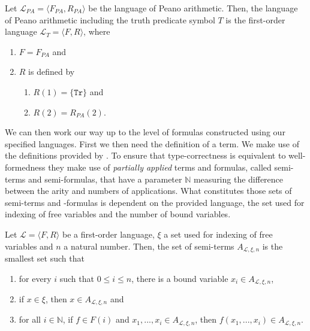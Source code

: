 \begin{definition}\label{def:lt}
    \leanok
    Let $\mathcal{L}_{PA} = \langle F_{PA},R_{PA}\rangle$ be the language of Peano arithmetic. Then, the language of Peano arithmetic including the truth predicate symbol $T$ is the first-order language $\mathcal{L}_T = \langle F, R \rangle$, where
    \begin{enumerate}
        \item $F = F_{PA}$ and
        \item $R$ is defined by
        \begin{enumerate}
            \item $R(1) = \{\texttt{Tr}\}$ and
            \item $R(2) = R_{PA}(2)$.
        \end{enumerate}
    \end{enumerate}
\end{definition}

We can then work our way up to the level of formulas constructed using our specified languages. First we then need the definition of a term. We make use of the definitions provided by \cite{ffl}. To ensure that type-correctness is equivalent to well-formedness they make use of \textit{partially applied} terms and formulas, called semi-terms and semi-formulas, that have a parameter $\mathbb{N}$ measuring the difference between the arity and numbers of applications. What constitutes those sets of semi-terms and -formulas is dependent on the provided language, the set used for indexing of free variables and the number of bound variables.

\begin{definition}\label{def:sem-t}
    \leanok
    Let $\mathcal{L} = \langle F, R \rangle$ be a first-order language, $\xi$ a set used for indexing of free variables and $n$ a natural number. Then, the set of semi-terms $A_{\mathcal{L},\xi,n}$ is the smallest set such that
    \begin{enumerate}
        \item for every $i$ such that $0 \leq i \leq n$, there is a bound variable $x_i \in A_{\mathcal{L},\xi,n}$,
        \item if $x \in \xi$, then $x \in A_{\mathcal{L},\xi,n}$ and
        \item for all $i \in \mathbb{N}$, if $f \in F(i)$ and $x_1,...,x_i \in A_{\mathcal{L},\xi,n}$, then $f(x_1,...,x_i) \in A_{\mathcal{L},\xi,n}$.
    \end{enumerate}
\end{definition}

